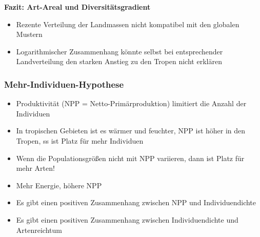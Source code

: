 \textbf{Fazit: Art-Areal und Diversitätsgradient}
\begin{itemize}
	\item Rezente Verteilung der Landmassen nicht kompatibel mit den globalen Mustern
	\item Logarithmischer Zusammenhang könnte selbst bei entsprechender Landverteilung den starken Anstieg zu den Tropen nicht erklären
\end{itemize}

\subsubsection{Mehr-Individuen-Hypothese}
\begin{itemize}
	\item Produktivität (NPP = Netto-Primärproduktion) limitiert die Anzahl der Individuen
	\item In tropischen Gebieten ist es wärmer und feuchter, NPP ist höher in den Tropen, ss ist Platz für mehr Individuen
	\item Wenn die Populationsgrößen nicht mit NPP variieren, dann ist Platz für mehr Arten!
\end{itemize}

\begin{itemize}
	\item Mehr Energie, höhere NPP
	\item Es gibt einen positiven Zusammenhang zwischen NPP und Individuendichte
	\item Es gibt einen positiven Zusammenhang zwischen Individuendichte und Artenreichtum
\end{itemize}

